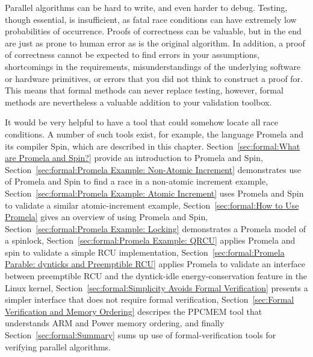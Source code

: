 


Parallel algorithms can be hard to write, and even harder to debug.
Testing, though essential, is insufficient, as fatal race conditions
can have extremely low probabilities of occurrence.
Proofs of correctness can be valuable, but in the end are just as
prone to human error as is the original algorithm.
In addition, a proof of correctness cannot be expected to find errors
in your assumptions, shortcomings in the requirements,
misunderstandings of the underlying software or hardware primitives,
or errors that you did not think to construct a proof for.
This means that formal methods can never replace testing, however,
formal methods are nevertheless a valuable addition to your validation toolbox.

It would be very helpful to have a tool that could somehow locate
all race conditions.
A number of such tools exist, for example,
the language Promela and its compiler Spin, which are described in
this chapter.
Section~\ref{sec:formal:What are Promela and Spin?} provide an
introduction to Promela and Spin,
Section~\ref{sec:formal:Promela Example: Non-Atomic Increment}
demonstrates use of Promela and Spin to find a race in a non-atomic increment
example,
Section~\ref{sec:formal:Promela Example: Atomic Increment}
uses Promela and Spin to validate a similar atomic-increment example,
Section~\ref{sec:formal:How to Use Promela}
gives an overview of using Promela and Spin,
Section~\ref{sec:formal:Promela Example: Locking}
demonstrates a Promela model of a spinlock,
Section~\ref{sec:formal:Promela Example: QRCU}
applies Promela and spin to validate a simple RCU implementation,
Section~\ref{sec:formal:Promela Parable: dynticks and Preemptible RCU}
applies Promela to validate an interface between preemptible RCU and
the dyntick-idle energy-conservation feature in the Linux kernel,
Section~\ref{sec:formal:Simplicity Avoids Formal Verification}
presents a simpler interface that does not require formal verification,
Section~\ref{sec:Formal Verification and Memory Ordering}
descripes the PPCMEM tool that understands ARM and Power memory ordering,
and finally
Section~\ref{sec:formal:Summary}
sums up use of formal-verification tools for verifying parallel algorithms.

